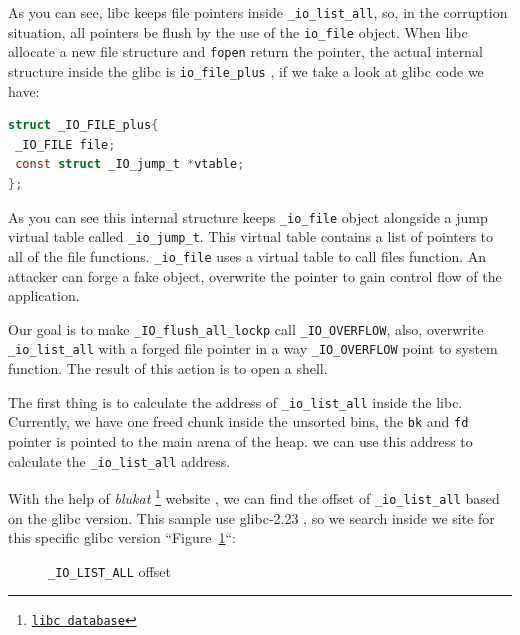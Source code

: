 \documentclass{masterthesis}
\newcommand*\libc{glibc}
\newcommand*\ub{unsorted bins}
\begin{document}
As you can see, libc keeps file pointers inside \lstinline{_io_list_all}, so, in the corruption situation, all pointers be flush by the use of the \lstinline{io_file} object. When libc allocate a new file structure and \lstinline{fopen} return the pointer, the actual internal structure inside the \libc{} is \lstinline{io_file_plus} , if we take a look at \libc{} code we have:

\begin{lstlisting}[language=c,frame=tlrb]
struct _IO_FILE_plus{
 _IO_FILE file;
 const struct _IO_jump_t *vtable;
};
\end{lstlisting}

As you can see this internal structure keeps \lstinline{_io_file} object alongside a jump virtual table called \lstinline{_io_jump_t}. This virtual table contains a list of pointers to all of the file functions. \lstinline{_io_file} uses a virtual table to call files function. An attacker can forge a fake object, overwrite the pointer to gain control flow of the application.

Our goal is to make \lstinline{_IO_flush_all_lockp} call \lstinline{_IO_OVERFLOW}, also, overwrite \lstinline{_io_list_all} with a forged file pointer in a way \lstinline{_IO_OVERFLOW} point to system function. The result of this action is to open a shell.

The first thing is to calculate the address of \lstinline{_io_list_all} inside the libc. Currently, we have one freed chunk inside the \ub{}, the \lstinline{bk} and \lstinline{fd} pointer is pointed to the main arena of the heap. we can use this address to calculate the \lstinline{_io_list_all} address.

With the help of \emph{blukat} \footnote{\href{https://libc.blukat.me}{\texttt{libc database}}} website , we can find the offset of \lstinline{_io_list_all} based on the \libc{} version. This sample use \libc{-2.23} , so we search inside we site for this specific \libc{} version ``Figure~\ref{fig:offset}``:

\begin{figure}[h!]
 \caption{\lstinline{_IO_LIST_ALL} offset}
 \label{fig:offset}
\end{figure}
\end{document}
